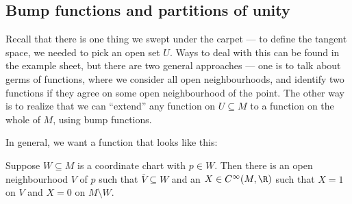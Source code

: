 \documentclass[a4paper]{article}
\begin{document}
\subsection{Bump functions and partitions of unity}
Recall that there is one thing we swept under the carpet --- to define the tangent space, we needed to pick an open set $U$. Ways to deal with this can be found in the example sheet, but there are two general approaches --- one is to talk about germs of functions, where we consider all open neighbourhoods, and identify two functions if they agree on some open neighbourhood of the point. The other way is to realize that we can ``extend'' any function on $U \subseteq M$ to a function on the whole of $M$, using bump functions.

In general, we want a function that looks like this:
\begin{center}
\end{center}

\begin{lemma}
  Suppose $W \subseteq M$ is a coordinate chart with $p \in W$. Then there is an open neighbourhood $V$ of $p$ such that $\bar{V} \subseteq W$ and an $X \in C^\infty(M, \R)$ such that $X = 1$ on $V$ and $X = 0$ on $M \setminus W$.
\end{lemma}
\end{document}
